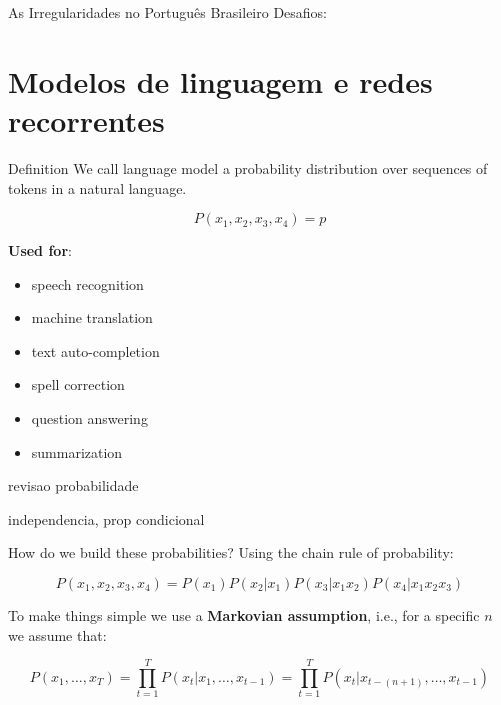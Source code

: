 \documentclass[10pt]{beamer}
\begin{document}
\begin{frame}[fragile]{As Irregularidades no Português Brasileiro}
Desafios:
\begin{itemize}
\end{itemize}
\end{frame}

\section{Modelos de linguagem e redes recorrentes}


\begin{frame}{Definition}
We call \alert{language model} a probability distribution over sequences of tokens in a natural language.

\[
P(x_1,x_2,x_3,x_4) = p
\]

\textbf{Used for}:
\begin{itemize}
\item speech recognition
\item machine translation
\item text auto-completion
\item spell correction
\item question answering
\item summarization
\end{itemize}


\end{frame}

\begin{frame}{revisao probabilidade}

independencia, prop condicional

\end{frame}


\begin{frame}{How do we build these probabilities?}
Using the chain rule of probability: 

\begin{equation*}
P(x_1,x_2,x_3,x_4) = P(x_1)P(x_2\vert x_1)P(x_3\vert x_1x_2)P(x_4\vert x_1x_2x_3)
\end{equation*}

\vspace{0.3cm}

To make things simple we use a \textbf{Markovian assumption}, i.e., for a specific $n$ we assume that:

\begin{equation*}
P(x_1, \dots, x_T) = \prod_{t=1}^{T} P(x_t \vert x_1, \dots, x_{t-1}) = \prod_{t=1}^{T} P(x_{t} \vert x_{t - (n+1)}, \dots, x_{t-1})
\end{equation*} 

\end{frame}
\end{document}
